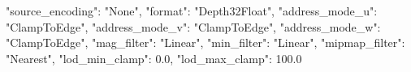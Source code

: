 {
    "source_encoding": "None",
    "format": "Depth32Float",
    "address_mode_u": "ClampToEdge",
    "address_mode_v": "ClampToEdge",
    "address_mode_w": "ClampToEdge",
    "mag_filter": "Linear",
    "min_filter": "Linear",
    "mipmap_filter": "Nearest",
    "lod_min_clamp": 0.0,
    "lod_max_clamp": 100.0
}